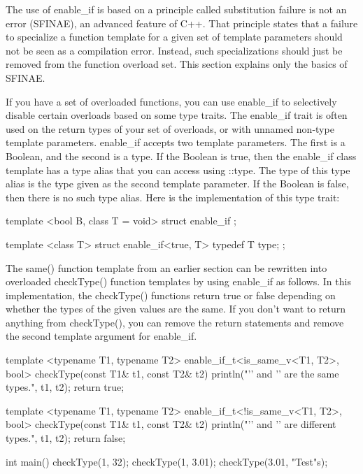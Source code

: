 
The use of enable\_if is based on a principle called substitution failure is not an error (SFINAE), an advanced feature of C++. That principle states that a failure to specialize a function template for a given set of template parameters should not be seen as a compilation error. Instead, such specializations should just be removed from the function overload set. This section explains only the basics of SFINAE.

If you have a set of overloaded functions, you can use enable\_if to selectively disable certain overloads based on some type traits. The enable\_if trait is often used on the return types of your set of overloads, or with unnamed non-type template parameters. enable\_if accepts two template parameters. The first is a Boolean, and the second is a type. If the Boolean is true, then the enable\_if class template has a type alias that you can access using ::type. The type of this type alias is the type given as the second template parameter. If the Boolean is false, then there is no such type alias. Here is the implementation of this type trait:

\begin{cpp}
template <bool B, class T = void>
struct enable_if {};

template <class T>
struct enable_if<true, T> { typedef T type; };
\end{cpp}

The same() function template from an earlier section can be rewritten into overloaded checkType() function templates by using enable\_if as follows. In this implementation, the checkType() functions return true or false depending on whether the types of the given values are the same. If you don’t want to return anything from checkType(), you can remove the return statements and remove the second template argument for enable\_if.

\begin{cpp}
template <typename T1, typename T2>
enable_if_t<is_same_v<T1, T2>, bool>
checkType(const T1& t1, const T2& t2)
{
    println("'{}' and '{}' are the same types.", t1, t2);
    return true;
}

template <typename T1, typename T2>
enable_if_t<!is_same_v<T1, T2>, bool>
checkType(const T1& t1, const T2& t2)
{
    println("'{}' and '{}' are different types.", t1, t2);
    return false;
}

int main()
{
    checkType(1, 32);
    checkType(1, 3.01);
    checkType(3.01, "Test"s);
}
\end{cpp}

